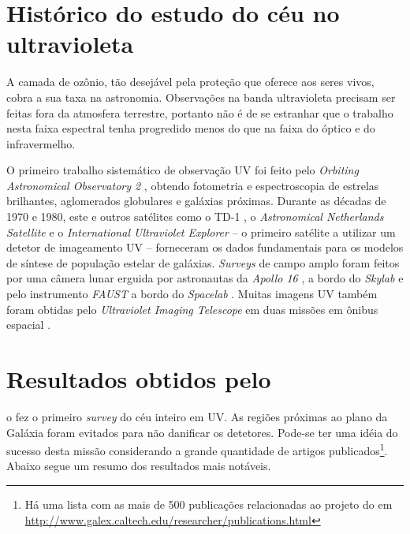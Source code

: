 \section{Histórico do estudo do céu no ultravioleta}
\label{sec:Galex:CeuUV}

A camada de ozônio, tão desejável pela proteção que oferece aos seres vivos,
cobra a sua taxa na astronomia. Observações na banda ultravioleta precisam ser
feitas fora da atmosfera terrestre, portanto não é de se estranhar que o
trabalho nesta faixa espectral tenha progredido menos do que na faixa do óptico
e do infravermelho.\citneed

O primeiro trabalho sistemático de observação UV foi feito pelo {\em Orbiting
Astronomical Observatory 2} \citep{Code1970}, obtendo fotometria e
espectroscopia de estrelas brilhantes, aglomerados globulares e galáxias
próximas. Durante as décadas de 1970 e 1980, este e outros satélites como o TD-1
\citep{Boksenberg1973}, o {\em Astronomical Netherlands Satellite}
\citep{vanDuinen1975} e o {\em International Ultraviolet Explorer}
\citep{Kondo1987} -- o primeiro satélite a utilizar um detetor de imageamento UV
-- forneceram os dados fundamentais para os modelos de síntese de população
estelar de galáxias. {\em Surveys} de campo amplo foram feitos por uma câmera
lunar erguida por astronautas da {\em Apollo 16} \citep{Carruthers1973}, a bordo
do {\em Skylab} \citep{Henize1975} e pelo instrumento {\em FAUST} a bordo do
{\em Spacelab} \citep{Bowyer1993}. Muitas imagens UV também foram obtidas pelo
{\em Ultraviolet Imaging Telescope} em duas missões em ônibus espacial
\citep{Stecher1997}.



\section{Resultados obtidos pelo \galex}
\label{sec:Galex:Resultados}

o \galex fez o primeiro {\em survey} do céu inteiro em UV. As regiões próximas
ao plano da Galáxia foram evitados para não danificar os detetores. Pode-se ter
uma idéia do sucesso desta missão considerando a grande quantidade de artigos
publicados\footnote{Há uma lista com as mais de 500 publicações relacionadas ao
projeto do \galex em
\url{http://www.galex.caltech.edu/researcher/publications.html}}. Abaixo segue
um resumo dos resultados mais notáveis.

